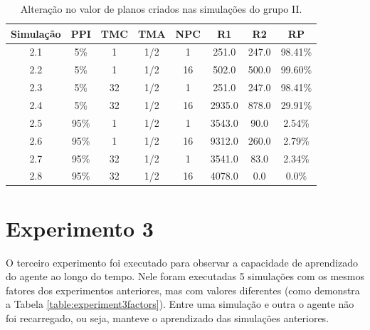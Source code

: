 \begin{table}
    \begin{center}
        \caption{ Alteração no valor de planos criados nas simulações do grupo II. }
        \label{table:plansaltv2}
        \begin{tabular}{ |c|c|c|c|c|c|c|c| }
            \hline
            \textbf{Simulação} & \textbf{PPI} & \textbf{TMC} & \textbf{TMA} & \textbf{NPC} & \textbf{R1} & \textbf{R2} & \textbf{RP}\\
            \hline
            2.1 & 5\% & 1 & 1/2 & 1 & 251.0 & 247.0 & 98.41\%\\
            \hline
            2.2 & 5\% & 1 & 1/2 & 16 & 502.0 & 500.0 & 99.60\%\\
            \hline
            2.3 & 5\% & 32 & 1/2 & 1 & 251.0 & 247.0 & 98.41\%\\
            \hline
            2.4 & 5\% & 32 & 1/2 & 16 & 2935.0 & 878.0 & 29.91\%\\
            \hline
            2.5 & 95\% & 1 & 1/2 & 1 & 3543.0 & 90.0 & 2.54\%\\
            \hline
            2.6 & 95\% & 1 & 1/2 & 16 & 9312.0 & 260.0 & 2.79\%\\
            \hline
            2.7 & 95\% & 32 & 1/2 & 1 & 3541.0 & 83.0 & 2.34\%\\
            \hline
            2.8 & 95\% & 32 & 1/2 & 16 & 4078.0 & 0.0 & 0.0\%\\
            \hline
            
        \end{tabular}{}
    \end{center}{}
\end{table}

\section{Experimento 3}

\label{section:exp3}

O terceiro experimento foi executado para observar a capacidade de aprendizado do agente ao longo do tempo. Nele foram executadas 5 simulações com os mesmos fatores dos experimentos anteriores, mas com valores diferentes (como demonstra a Tabela \ref{table:experiment3factors}). Entre uma simulação e outra o agente não foi recarregado, ou seja, manteve o aprendizado das simulações anteriores.

